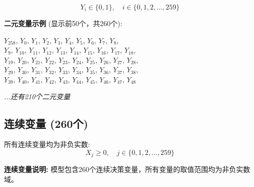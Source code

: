 \documentclass[a4paper,10pt]{article}
\begin{document}
\begin{equation}
Y_i \in \{0,1\}, \quad i \in \{0, 1, 2, \ldots, 259\}
\end{equation}

\textbf{二元变量示例} (显示前50个，共260个):

{\small
$Y_{258}$, $Y_{0}$, $Y_{1}$, $Y_{2}$, $Y_{3}$, $Y_{4}$, $Y_{5}$, $Y_{6}$, $Y_{7}$, $Y_{8}$, \\
$Y_{9}$, $Y_{10}$, $Y_{11}$, $Y_{12}$, $Y_{13}$, $Y_{14}$, $Y_{15}$, $Y_{16}$, $Y_{17}$, $Y_{18}$, \\
$Y_{19}$, $Y_{20}$, $Y_{21}$, $Y_{22}$, $Y_{23}$, $Y_{24}$, $Y_{25}$, $Y_{26}$, $Y_{27}$, $Y_{28}$, \\
$Y_{29}$, $Y_{30}$, $Y_{31}$, $Y_{32}$, $Y_{33}$, $Y_{34}$, $Y_{35}$, $Y_{36}$, $Y_{37}$, $Y_{38}$, \\
$Y_{39}$, $Y_{40}$, $Y_{41}$, $Y_{42}$, $Y_{43}$, $Y_{44}$, $Y_{45}$, $Y_{46}$, $Y_{47}$, $Y_{48}$

\textit{...还有210个二元变量}
}

\subsection{连续变量 (260个)}

所有连续变量均为非负实数:
\begin{equation}
X_j \geq 0, \quad j \in \{0, 1, 2, \ldots, 259\}
\end{equation}

\textbf{连续变量说明:} 模型包含260个连续决策变量，所有变量的取值范围均为非负实数域。
\end{document}

